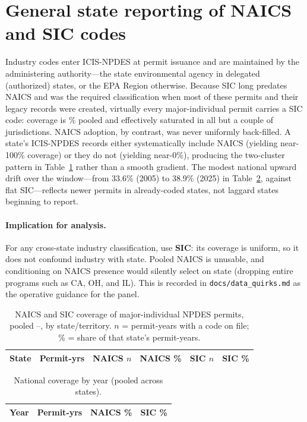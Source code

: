 \documentclass[11pt]{article}
\begin{document}
\section*{General state reporting of NAICS and SIC codes}
Industry codes enter ICIS-NPDES at permit issuance and are maintained by the
administering authority---the state environmental agency in delegated (authorized)
states, or the EPA Region otherwise. Because SIC long predates NAICS and was the
required classification when most of these permits and their legacy records were
created, virtually every major-individual permit carries a SIC code: coverage is
\covNatSic\% pooled and effectively saturated in all but a couple of jurisdictions.
NAICS adoption, by contrast, was never uniformly back-filled. A state's ICIS-NPDES
records either systematically include NAICS (yielding near-100\% coverage) or they
do not (yielding near-0\%), producing the two-cluster pattern in
Table~\ref{tab:cov_state} rather than a smooth gradient. The modest national
upward drift over the window---from 33.6\% (2005) to 38.9\% (2025) in
Table~\ref{tab:cov_year}, against flat SIC---reflects newer permits in already-coded
states, not laggard states beginning to report.

\paragraph{Implication for analysis.} For any cross-state industry classification,
use \textbf{SIC}: its coverage is uniform, so it does not confound industry with
state. Pooled NAICS is unusable, and conditioning on NAICS presence would silently
select on state (dropping entire programs such as CA, OH, and IL). This is recorded
in \texttt{docs/data\_quirks.md} as the operative guidance for the panel.

\begin{table}[htbp]
\centering
\scriptsize
\caption{NAICS and SIC coverage of major-individual NPDES permits, pooled
\covYearMin--\covYearMax, by state/territory. $n$ = permit-years with a code on
file; \% = share of that state's permit-years.}\label{tab:cov_state}
\begin{tabular}{l r r r r r}
\toprule
State & Permit-yrs & NAICS $n$ & NAICS \% & SIC $n$ & SIC \% \\
\midrule

\end{tabular}
\end{table}

\begin{table}[h]
\centering
\caption{National coverage by year (pooled across states).}\label{tab:cov_year}
\begin{tabular}{r r r r}
\toprule
Year & Permit-yrs & NAICS \% & SIC \% \\
\midrule

\end{tabular}
\end{table}
\end{document}
